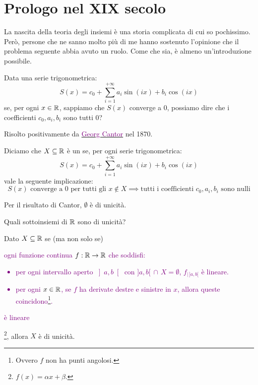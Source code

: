\section{Prologo nel XIX secolo}
La nascita della teoria degli insiemi è una storia complicata di cui so pochissimo. Però, persone che ne sanno molto più di me hanno sostenuto l'opinione che il problema seguente
abbia avuto un ruolo. Come che sia, è almeno un'introduzione possibile.

\begin{problem}
Data una serie trigonometrica:
\[ S(x) = c_0 + \sum_{i=1}^{+\infty}a_i\sin{(ix)}+b_i\cos{(ix)}
	\]
se, per ogni $x \in \mathbb R$, sappiamo che $S(x)$ converge a 0, possiamo dire che i coefficienti $c_0,a_i,b_i$ sono tutti 0?
\end{problem}

Risolto positivamente da \href{https://it.wikipedia.org/wiki/Georg_Cantor}{\textcolor{purple}{Georg Cantor}} nel 1870.

\begin{definition}
Diciamo che $X \subseteq \mathbb R$ è un  se, per ogni serie trigonometrica:
\[ S(x) = c_0 + \sum_{i=1}^{+\infty}a_i\sin{(ix)}+b_i\cos{(ix)}
	\]
vale la seguente implicazione:
\[ \text{$S(x)$ converge a 0 per tutti gli $x\not\in X$} \implies \text{tutti i coefficienti $c_0,a_i,b_i$ sono nulli}
	\]
\end{definition}

\begin{example}
	Per il risultato di Cantor, $\emptyset$ è di unicità.
\end{example}

\begin{problem}
	Quali sottoinsiemi di $\mathbb R$ sono di unicità?
\end{problem}

\begin{fact}
Dato $X \subseteq \mathbb R$ se (ma non solo se) \textcolor{purple}{ogni funzione continua $f : \mathbb R \to \mathbb R$ che soddisfi:
\begin{itemize}
	\item per ogni intervallo aperto $\left]a,b\right[$ con $]a,b[ \,\cap\, X = \emptyset$, $f_{| \, ]a,b[}$ è lineare.
	\item per ogni $x \in \mathbb R$, se $f$ ha derivate destre e sinistre in $x$, allora queste coincidono\footnote{Ovvero $f$ non ha punti angolosi.}.
\end{itemize}
è lineare}\footnote{$f(x) = \alpha x + \beta$.}, allora $X$ è di unicità.
\end{fact}

